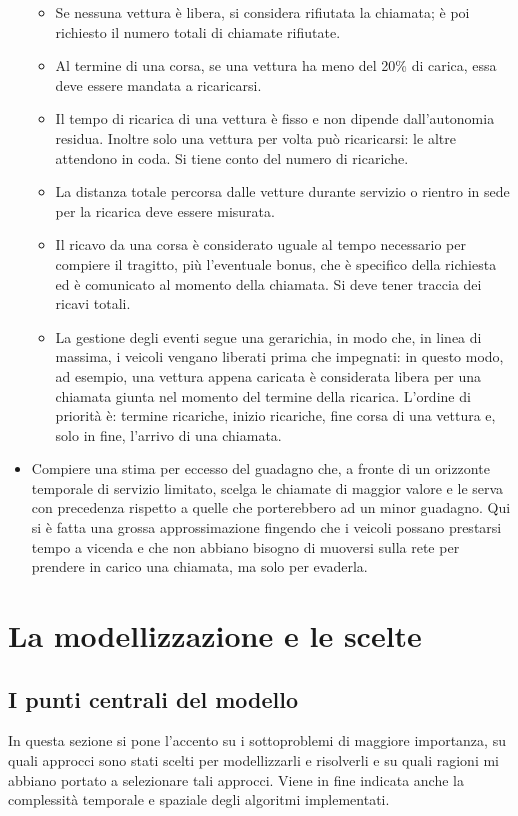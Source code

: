 \documentclass[a4paper,11pt]{Article}
\begin{document}
\begin{itemize}
\begin{itemize}
    \item Se nessuna vettura è libera, si considera rifiutata la chiamata; è poi richiesto il numero totali di chiamate rifiutate.
    \item Al termine di una corsa, se una vettura ha meno del 20\% di carica, essa deve essere mandata a ricaricarsi.
    \item Il tempo di ricarica di una vettura è fisso e non dipende dall'autonomia residua. Inoltre solo una vettura per volta può ricaricarsi: le altre attendono in coda. Si tiene conto del numero di ricariche.
    \item La distanza totale percorsa dalle vetture durante servizio o rientro in sede per la ricarica deve essere misurata.
    \item Il ricavo da una corsa è considerato uguale al tempo necessario per compiere il tragitto, più l'eventuale bonus, che è specifico della richiesta ed è comunicato al momento della chiamata. Si deve tener traccia dei ricavi totali.
    \item La gestione degli eventi segue una gerarichia, in modo che, in linea di massima, i veicoli vengano liberati prima che impegnati: in questo modo, ad esempio, una vettura appena caricata è considerata libera per una chiamata giunta nel momento del termine della ricarica. L'ordine di priorità è: termine ricariche, inizio ricariche, fine corsa di una vettura e, solo in fine, l'arrivo di una chiamata.
  \end{itemize}
\item Compiere una stima per eccesso del guadagno che, a fronte di un orizzonte temporale di servizio limitato, scelga le chiamate di maggior valore e le serva con precedenza rispetto a quelle che porterebbero ad un minor guadagno. Qui si è fatta una grossa approssimazione fingendo che i veicoli possano prestarsi tempo a vicenda e che non abbiano bisogno di muoversi sulla rete per prendere in carico una chiamata, ma solo per evaderla.
\end{itemize}



\section{La modellizzazione e le scelte}
\subsection{I punti centrali del modello}

In questa sezione si pone l'accento su i sottoproblemi di maggiore importanza, su quali approcci sono stati scelti per modellizzarli e risolverli e su quali ragioni mi abbiano portato a selezionare tali approcci. Viene in fine indicata anche la complessità temporale e spaziale degli algoritmi implementati.
\end{document}
